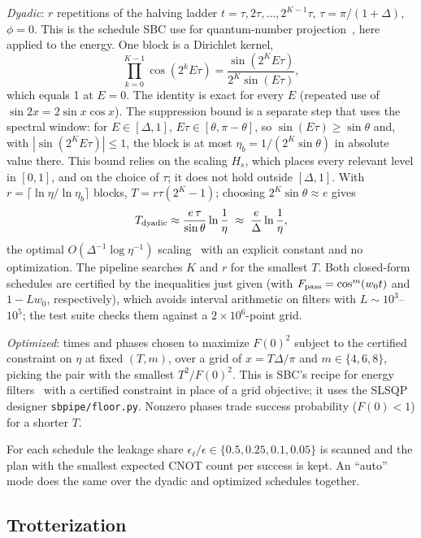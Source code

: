 \documentclass[aps,pra,twocolumn,superscriptaddress,nofootinbib]{revtex4-2}
\begin{document}
\emph{Dyadic}: $r$ repetitions of the halving ladder $t=\tau,2\tau,\dots,2^{K-1}\tau$,
$\tau=\pi/(1+\Delta)$, $\phi=0$. This is the schedule SBC use for quantum-number
projection~\cite{Stetcu2023}, here applied to the energy. One block is a Dirichlet kernel,
\begin{equation}
\prod_{k=0}^{K-1}\cos(2^kE\tau)=\frac{\sin(2^KE\tau)}{2^K\sin(E\tau)},
\label{eq:dirichlet}
\end{equation}
which equals 1 at $E=0$. The identity is exact for every $E$ (repeated use of $\sin2x=2\sin x\cos x$).
The suppression bound is a separate step that uses the spectral window: for $E\in[\Delta,1]$,
$E\tau\in[\theta,\pi-\theta]$, so $\sin(E\tau)\ge\sin\theta$ and, with $|\sin(2^KE\tau)|\le1$, the block
is at most $\eta_b=1/(2^K\sin\theta)$ in absolute value there. This bound relies on the scaling $H_s$,
which places every relevant level in $[0,1]$, and on the choice of $\tau$; it does not hold outside
$[\Delta,1]$. With $r=\lceil\ln\eta/\ln\eta_b\rceil$ blocks,
$T=r\tau(2^K-1)$; choosing $2^K\sin\theta\approx e$ gives
\begin{equation}
T_{\rm dyadic}\approx\frac{e\,\tau}{\sin\theta}\ln\frac1\eta\;\approx\;\frac{e}{\Delta}\ln\frac1\eta ,
\end{equation}
the optimal $O(\Delta^{-1}\log\eta^{-1})$ scaling~\cite{Lin2020} with an explicit constant and no
optimization. The pipeline searches $K$ and $r$ for the smallest $T$. Both closed-form schedules are
certified by the inequalities just given (with $F_{\rm pass}=\cos^m(w_0t)$ and $1-Lw_0$,
respectively), which avoids interval arithmetic on filters with $L\sim10^{3}$--$10^{5}$; the
test suite checks them against a $2\times10^6$-point grid.

\emph{Optimized}: times and phases chosen to maximize $F(0)^2$ subject to the certified constraint on
$\eta$ at fixed $(T,m)$, over a grid of $x=T\Delta/\pi$ and $m\in\{4,6,8\}$, picking the pair with the
smallest $T^2/F(0)^2$. This is SBC's recipe for energy filters~\cite{Stetcu2023} with a certified
constraint in place of a grid objective; it uses the SLSQP designer \texttt{sbpipe/floor.py}.
Nonzero phases trade success probability ($F(0)<1$) for a shorter $T$.

For each schedule the leakage share $\epsilon_\ell/\epsilon\in\{0.5,0.25,0.1,0.05\}$ is scanned and the
plan with the smallest expected CNOT count per success is kept. An ``auto'' mode does the same over the dyadic and optimized
schedules together.

\subsection{Trotterization}
\end{document}
